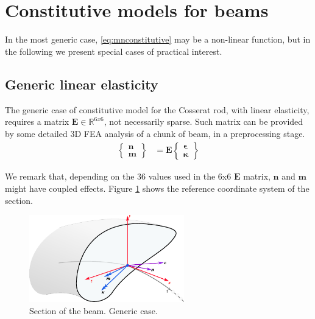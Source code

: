 \documentclass[review]{elsarticle}
\def\avect#1{{\boldsymbol{#1}}}
\def\amatr#1{{\boldsymbol{#1}}}
\begin{document}
\appendix
\section{Constitutive models for beams}
\label{sec:constitutive}

In the most generic case, \eqref{eq:mnconstitutive} may be a non-linear function, but in the following we present special cases of practical interest.

\subsection{Generic linear elasticity}
\label{sec:generic}

The generic case of constitutive model for the Cosserat rod, with linear elasticity, requires a matrix $\amatr{E} \in \mathbb{R}^{6x6}$, not necessarily sparse. Such matrix can be provided by some detailed 3D FEA analysis of a chunk of beam, in a preprocessing stage.
%
\begin{align}
    \left\{  
    \begin{array}{c}
     \avect{n} \\
     \avect{m} 
    \end{array}
    \right\}
    &= 
    \amatr{E}
    \left\{  
    \begin{array}{c}
     \avect{\epsilon} \\
     \avect{\kappa}
    \end{array}
    \right\}
\end{align}

We remark that, depending on the 36 values used in the 6x6 $\amatr{E}$ matrix,  $\avect{n}$ and $\avect{m}$ might have coupled effects. Figure \ref{fig:section} shows the reference coordinate system of the section.

\begin{figure}[ht]
    \centering
    \includegraphics[width=0.60\textwidth]{section_beam.pdf}
    \caption{Section of the beam. Generic case.}
    \label{fig:section}
\end{figure}
\end{document}
